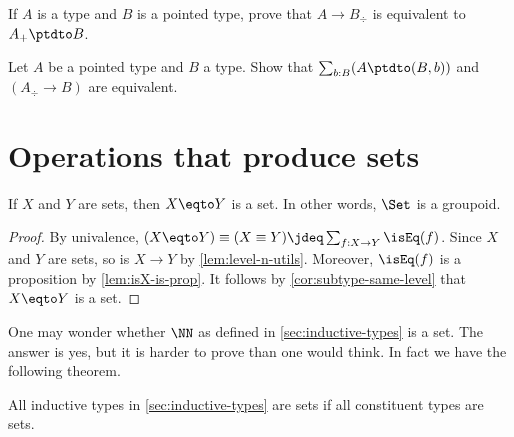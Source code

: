 \begin{xca}\label{xca:plusforgetadjoint}
If $A$ is a type and $B$ is a pointed type,
prove that $A\to B_\div$ is equivalent to $A_+\ptdto B$.
\end{xca}

\begin{xca}\label{xca:freemaps}
  Let $A$ be a pointed type and $B$ a type.
  Show that $\sum_{b:B}(A\ptdto (B,b))$ and $(A_\div\to B)$ are equivalent.
\end{xca}


\section{Operations that produce sets}
\label{sec:operations-on-sets}

\begin{lemma}\label{lem:Set-is-groupoid}
If $X$ and $Y$ are sets, then $X \eqto Y$ is a set.
In other words, $\Set$ is a groupoid.
\end{lemma}

\begin{proof}
    By univalence, $(X \eqto Y) \equiv (X\equiv Y) \jdeq \sum_{f:X\to Y} \isEq(f)$. Since $X$ and $Y$ are sets,
    so is $X\to Y$ by \cref{lem:level-n-utils}. Moreover,
    $\isEq(f)$ is a proposition by \cref{lem:isX-is-prop}.
    It follows by \cref{cor:subtype-same-level} that $X \eqto Y$ is a set.
\end{proof}

One may wonder whether $\NN$ as defined in \cref{sec:inductive-types}
is a set. The answer is yes, but it is harder to prove than one
would think. In fact we have the following theorem.

\begin{theorem}\label{thm:isset-inductive-types}
All inductive types in \cref{sec:inductive-types} are sets
if all constituent types are sets.
\end{theorem}

